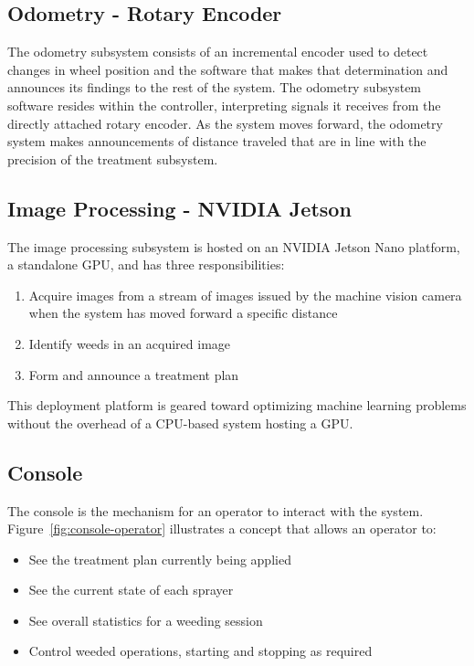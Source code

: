 \documentclass[letterpaper]{article}
\begin{document}
{{\subsection{Odometry - Rotary Encoder}
The odometry subsystem consists of an incremental encoder used to detect changes in wheel position and the software that makes that determination and announces its findings to the rest of the system. The odometry subsystem software resides within the controller, interpreting signals it receives from the directly attached rotary encoder. As the system moves forward, the odometry system makes announcements of distance traveled that are in line with the precision of the treatment subsystem. 

\subsection{Image Processing - NVIDIA Jetson}
The image processing subsystem is hosted on an NVIDIA Jetson Nano platform, a standalone GPU, and has three responsibilities:
\begin{enumerate}
\item{Acquire images from a stream of images issued by the machine vision camera when the system has moved forward a specific distance}
\item{Identify weeds in an acquired image}
\item{Form and announce a treatment plan}
\end{enumerate} 

This deployment platform is geared toward optimizing machine learning problems without the overhead of a CPU-based system hosting a GPU.
 
\subsection{Console}
The console is the mechanism for an operator to interact with the system. Figure~\ref{fig:console-operator} illustrates a concept that allows an operator to:
\begin{itemize}
	\item{See the treatment plan currently being applied}
	\item{See the current state of each sprayer}
	\item{See overall statistics for a weeding session}
	\item{Control weeded operations, starting and stopping as required}
\end{itemize}
	

}}
\end{document}

